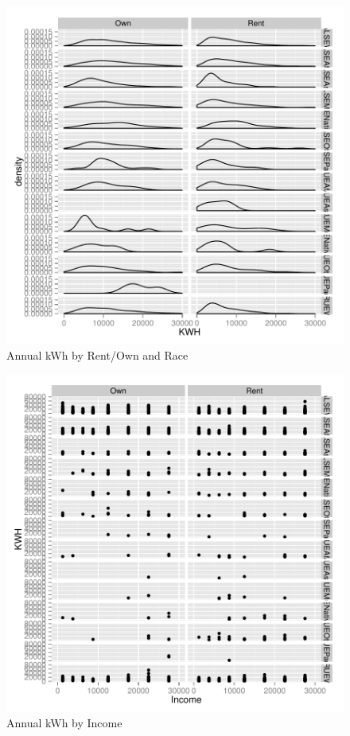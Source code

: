 \documentclass{article}
\begin{document}
\begin{figure}
\begin{center}
\caption{Annual kWh by Rent/Own and Race}
\label{fig:kWhbyOwnRace}
\includegraphics{DraftEdwardsWoods-005}
\end{center}
\end{figure}



\begin{figure}
\begin{center}
\caption{Annual kWh by Income}
\label{fig:kWhbyIncome}
\includegraphics{DraftEdwardsWoods-006}
\end{center}
\end{figure}
\end{document}

